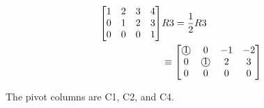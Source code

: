 \documentclass{mathhomework}
\newcommand{\circnum}[1]{\text{\textcircled{#1}}}
\begin{document}
\begin{problem}[1.2\#3]
\begin{solution}
\begin{align*}
            \begin{bmatrix}
                1 & 2 & 3 & 4 \\
                0 & 1 & 2 & 3 \\
                0 & 0 & 0 & 1
            \end{bmatrix}
            & R3 = \frac{1}{2} R3 \\ & \equiv
            \begin{bmatrix}
                \circnum{1} & 0 & -1 & -2 \\
                0 & \circnum{1} & 2 & 3 \\
                0 & 0 & 0 & 0
            \end{bmatrix}
        \end{align*}

        The pivot columns are C1, C2, and C4.
    \end{solution}
\end{problem}
\end{document}

